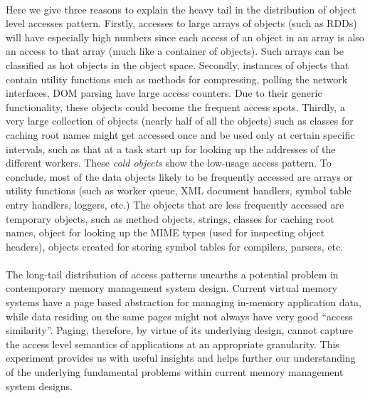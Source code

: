 \paragraph{}
Here we give three reasons to explain the heavy tail in the distribution
of object level accesses pattern.
Firstly, accesses to large arrays of objects (such as RDDs) will have
especially high numbers since each access of an object in an array is
also an access to that array (much like a container of objects).  Such
arrays can be classified as hot objects in the object space.
Secondly, instances of objects that contain utility functions such as
methods for compressing, polling the network interfaces, DOM parsing
have large access counters. Due to their generic functionality, these
objects could become the frequent access spots.
Thirdly, a very large collection of objects (nearly half of all the
objects) such as classes for caching root names might get accessed once
and be used only at certain specific intervals, such as that at a task
start up for looking up the addresses of the different workers.  These
\emph{cold objects} show the low-usage access pattern. 
To conclude, most of the data objects likely to be frequently accessed
are arrays or utility functions (such as worker queue, XML document
handlers, symbol table entry handlers, loggers, etc.)
The objects that are less frequently
accessed are temporary objects, such as method objects, strings, classes
for caching root names, object for looking up the MIME types (used for
inspecting object headers), objects created for storing symbol tables
for compilers, parsers, etc.

\paragraph{}	
The long-tail distribution of access patterns unearths a potential
problem in contemporary memory management system design. Current virtual
memory systems have a page based abstraction for managing in-memory application
data, while data residing on the same pages might not
always have very good ``access similarity''. Paging, therefore, by virtue
of its underlying design, cannot capture the access level semantics of
applications at an appropriate granularity. This experiment provides us with
useful insights and helps further our understanding of the underlying
fundamental problems within current memory management system designs.



